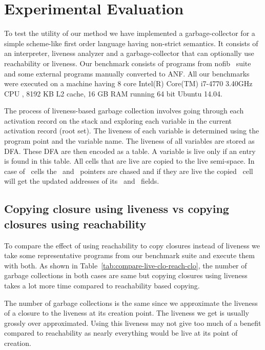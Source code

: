 \documentclass[9pt]{sigplanconf}
\begin{document}
\section{Experimental Evaluation}
\label{sec:experiments}
To   test  the   utility  of   our  method   we  have   implemented  a
garbage-collector for a simple scheme-like first order language having
non-strict semantics. It consists of an interpreter, liveness analyzer
and  a  garbage-collector  that  can optionally  use  reachability  or
liveness.  Our benchmark consists  of programs from nofib~\cite{nofib}
suite and some  external programs manually converted to  ANF.  All our
benchmarks were executed on a  machine having 8 core Intel(R) Core(TM)
i7-4770 3.40GHz  CPU ,  8192 KB  L2 cache,  16 GB  RAM running  64 bit
Ubuntu 14.04.


The process of liveness-based garbage collection involves going through 
each activation record on the stack and exploring each variable in the 
current activation record (root set). The liveness of each variable is 
determined using the program point and the variable name. The liveness 
of all variables are stored as DFA. These DFA are then encoded as a 
table. A variable is live only if an entry is found in this table.
All cells that are live are copied to the live semi-space. In case of 
\CONS\ cells the \CAR\ and \CDR\ pointers are chased and if they are 
live the copied \CONS\ cell will get the updated addresses of its 
\CAR\ and \CDR\ fields.

\subsection{Copying closure using liveness vs copying closures using reachability}\label{sec:strategies}

To compare the  effect of using reachability to  copy closures instead
of liveness  we take some  representative programs from  our benchmark
suite    and    execute    them    with    both.     As    shown    in
Table~\ref{tab:compare-live-clo-reach-clo},  the   number  of  garbage
collections in both cases are same but copying closures using liveness
takes a lot more time compared to reachability based copying.

The number  of garbage  collections is the same  since we  approximate the
liveness of  a closure  to the  liveness at  its creation  point.  The
liveness  we get  is usually  grossly over  approximated.  Using  this
liveness may not  give too much of a benefit  compared to reachability
as nearly everything would be live at its point of creation.
\end{document}
